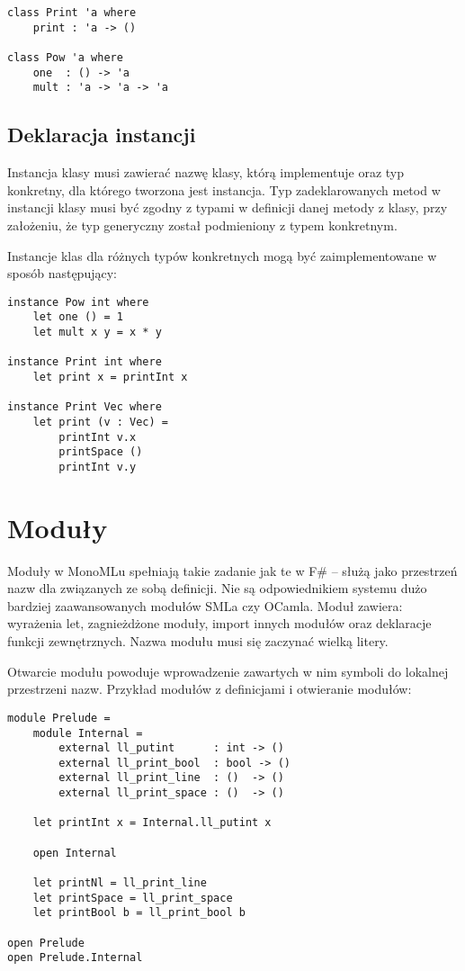 \documentclass[declaration,shortabstract]{iithesis}
\begin{document}
\begin{lstlisting}[frame=lines]
class Print 'a where 
    print : 'a -> ()
  
class Pow 'a where 
    one  : () -> 'a
    mult : 'a -> 'a -> 'a
\end{lstlisting}

\subsection{Deklaracja instancji}

Instancja klasy musi zawierać nazwę klasy, którą implementuje oraz typ konkretny,
dla którego tworzona jest instancja. Typ zadeklarowanych metod w
instancji klasy musi być zgodny z typami w definicji danej metody z klasy,
przy założeniu, że typ generyczny został podmieniony z typem konkretnym. 

Instancje klas dla różnych typów konkretnych 
mogą być zaimplementowane w sposób następujący:

\begin{lstlisting}[frame=lines]
instance Pow int where
    let one () = 1 
    let mult x y = x * y

instance Print int where 
    let print x = printInt x 

instance Print Vec where 
    let print (v : Vec) = 
        printInt v.x 
        printSpace ()
        printInt v.y
\end{lstlisting}

\section{Moduły}

Moduły w MonoMLu spełniają takie zadanie jak te w F\# -- służą jako 
przestrzeń nazw dla związanych ze sobą definicji. Nie są odpowiednikiem 
systemu dużo bardziej zaawansowanych modułów SMLa czy OCamla.
Moduł zawiera: wyrażenia let, zagnieżdżone moduły, import innych 
modułów oraz deklaracje funkcji zewnętrznych. Nazwa modułu musi się zaczynać 
wielką litery. 

Otwarcie modułu powoduje wprowadzenie zawartych w nim symboli do 
lokalnej przestrzeni nazw. Przykład modułów z definicjami 
i otwieranie modułów:

\begin{lstlisting}[frame=lines]
module Prelude = 
    module Internal = 
        external ll_putint      : int -> () 
        external ll_print_bool  : bool -> () 
        external ll_print_line  : ()  -> () 
        external ll_print_space : ()  -> () 

    let printInt x = Internal.ll_putint x

    open Internal 
    
    let printNl = ll_print_line
    let printSpace = ll_print_space
    let printBool b = ll_print_bool b

open Prelude
open Prelude.Internal
\end{lstlisting}
\end{document}
